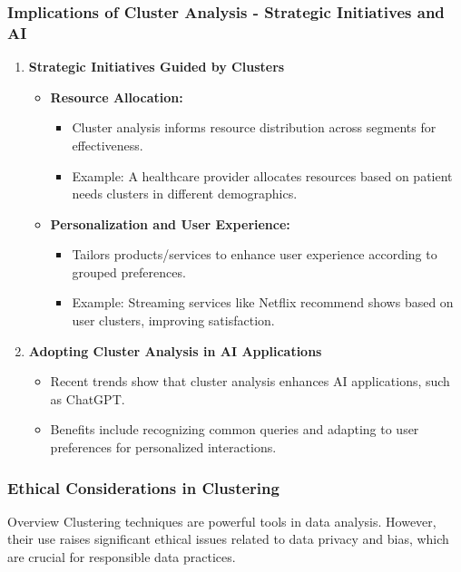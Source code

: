 \documentclass[aspectratio=169]{beamer}
\begin{document}
\begin{frame}[fragile]
    \frametitle{Implications of Cluster Analysis - Strategic Initiatives and AI}
    \begin{enumerate}
        \item \textbf{Strategic Initiatives Guided by Clusters}
            \begin{itemize}
                \item \textbf{Resource Allocation:}
                    \begin{itemize}
                        \item Cluster analysis informs resource distribution across segments for effectiveness.
                        \item Example: A healthcare provider allocates resources based on patient needs clusters in different demographics.
                    \end{itemize}
                
                \item \textbf{Personalization and User Experience:}
                    \begin{itemize}
                        \item Tailors products/services to enhance user experience according to grouped preferences.
                        \item Example: Streaming services like Netflix recommend shows based on user clusters, improving satisfaction.
                    \end{itemize}
            \end{itemize}

        \item \textbf{Adopting Cluster Analysis in AI Applications}
            \begin{itemize}
                \item Recent trends show that cluster analysis enhances AI applications, such as ChatGPT.
                \item Benefits include recognizing common queries and adapting to user preferences for personalized interactions.
            \end{itemize}
    \end{enumerate}
\end{frame}

\begin{frame}[fragile]
    \frametitle{Ethical Considerations in Clustering}
    \begin{block}{Overview}
        Clustering techniques are powerful tools in data analysis. However, their use raises significant ethical issues related to data privacy and bias, which are crucial for responsible data practices.
    \end{block}
\end{frame}
\end{document}
